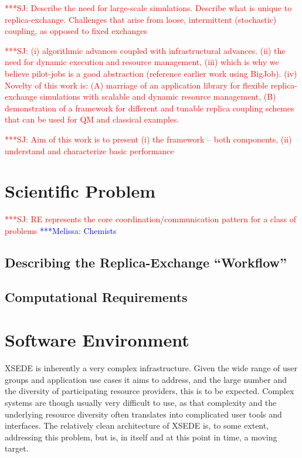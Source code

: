 \documentclass{sig-alternate}
\newcommand{\jhanote}[1]{ {\textcolor{red} { ***SJ: #1 }}}
\newcommand{\mrnote}[1]{ {\textcolor{blue} { ***Melissa: #1 }}}
\newcommand{\jhanote}[1]{}
\begin{document}
\jhanote{Describe the need for large-scale simulations. Describe what
  is unique to replica-exchange. Challenges that arise from loose,
  intermittent (stochastic) coupling, as opposed to fixed exchanges}

\jhanote{(i) algorithmic advances coupled with infrastructural
  advances. (ii) the need for dynamic execution and resource
  management, (iii) which is why we believe pilot-jobs is a good
  abstraction (reference earlier work using BigJob). (iv) Novelty of
  this work is: (A) marriage of an application library for flexible
  replica-exchange simulations with scalable and dynamic resource
  management, (B) demonstration of a framework for different and
  tunable replica coupling schemes that can be used for QM and
  classical examples.}
 
\jhanote{Aim of this work is to present (i) the framework -- both
  components, (ii) understand and characterize basic performance}
  
\section{Scientific Problem}\label{sec:requirements}

\jhanote{RE represents the core coordination/communication pattern for
  a class of problems}
\mrnote{Chemists}

\subsection{Describing the Replica-Exchange ``Workflow'' } \label{}

\subsection{Computational Requirements}

\section{Software Environment}

XSEDE is inherently a very complex infrastructure. Given
the wide range of user groups and application use cases it
aims to address, and the large number and the diversity
of participating resource providers, this is to be expected.
Complex systems are though usually very difficult to use, as
that complexity and the underlying resource diversity often
translates into complicated user tools and interfaces. The
relatively clean architecture of XSEDE is, to some extent,
addressing this problem, but is, in itself and at this point in
time, a moving target.
\end{document}
